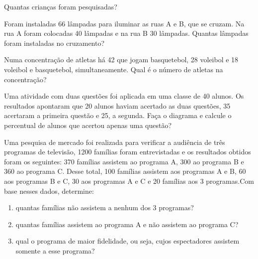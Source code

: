 Quantas crianças foram pesquisadas?

	\item Foram instaladas 66 lâmpadas para iluminar as ruas A e B, que se cruzam. Na rua A foram colocadas 40 lâmpadas e na rua B 30 lâmpadas. Quantas lâmpadas foram instaladas no cruzamento?

	\item Numa concentração de atletas há 42 que jogam basquetebol, 28 voleibol e 18 voleibol e basquetebol, simultaneamente. Qual é o número de atletas na concentração?

	\item Uma atividade com duas questões foi aplicada em uma classe de 40 alunos. Os resultados apontaram que 20 alunos haviam acertado as duas questões, 35 acertaram a primeira questão e 25, a segunda. Faça o diagrama e calcule o percentual de alunos que acertou apenas uma questão?

	\item Uma pesquisa de mercado foi realizada para verificar a audiência de três programas de televisão, 1200 famílias foram entrevistadas e os resultados obtidos foram os seguintes: 370 famílias assistem ao programa A, 300 ao programa B e 360 ao programa C. Desse total, 100 famílias assistem aos programas A e B, 60 aos programas B e C, 30 aos programas A e C e 20 famílias aos 3 programas.Com base nesses dados, determine:
	\begin{enumerate}
	\item quantas famílias não assistem a nenhum dos 3 programas?
	\item quantas famílias assistem ao programa A e não assistem ao programa C?
	\item qual o programa de maior fidelidade, ou seja, cujos espectadores assistem somente a esse programa?
	\end{enumerate}
	
	